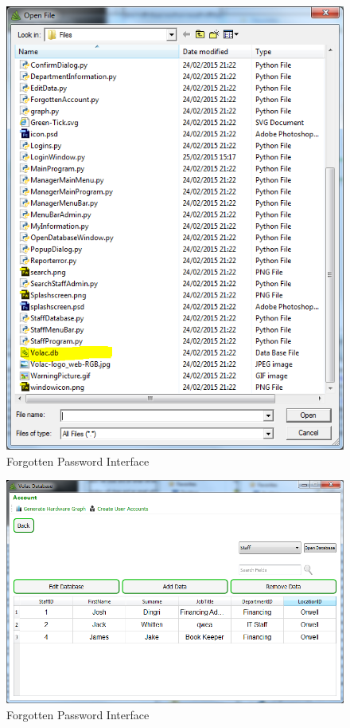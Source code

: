 \begin{figure}[H]
    \includegraphics[width=\textwidth]{./Testing/Images/OpenDatabaseFileBrowser.png}
    \caption{Forgotten Password Interface} \label{fig:OpenDatabaseFileBrowser}
\end{figure}


\begin{figure}[H]
    \includegraphics[width=\textwidth]{./Testing/Images/OpenDatabaseAfterBrowser.png}
    \caption{Forgotten Password Interface} \label{fig:OpenDatabaseAfterBrowser}
\end{figure}


